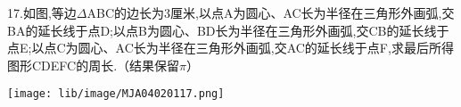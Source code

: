 17.如图,等边$\Delta$ABC的边长为3厘米,以点A为圆心、AC长为半径在三角形外画弧,交BA的延长线于点D;以点B为圆心、BD长为半径在三角形外画弧,交CB的延长线于点E;以点C为圆心、AC长为半径在三角形外画弧,交AC的延长线于点F,求最后所得图形CDEFC的周长.（结果保留$\pi$）

\begin{flushright}

    \texttt{[image: lib/image/MJA04020117.png]}

\end{flushright}



